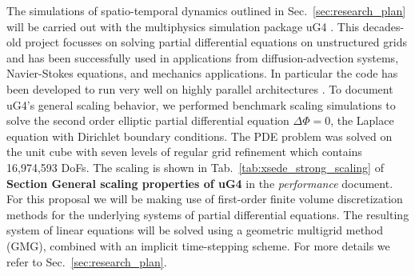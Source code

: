 \label{sec:Project-Details}
The simulations of spatio-temporal dynamics outlined in Sec.~\ref{sec:research_plan} will be carried out with the multiphysics simulation package uG4 \citep{Vogel2013, Heppner13}. This decades-old project focusses on solving partial differential equations on unstructured grids and has been successfully used in applications from diffusion-advection systems, Navier-Stokes equations, and mechanics applications. In particular the code has been developed to run very well on highly parallel architectures \citep{Vogel2013, Heppner13}. To document uG4's general scaling behavior, we performed benchmark scaling simulations to solve the second order elliptic partial differential equation $\Delta \Phi = 0$, the Laplace equation with Dirichlet boundary conditions. The PDE problem was solved on the unit cube with seven levels of regular grid refinement which contains 16,974,593 DoFs. The scaling is shown in Tab.~\ref{tab:xsede_strong_scaling} of \textbf{Section General scaling properties of uG4} in the \textit{performance} document. For this proposal we will be making use of first-order finite volume discretization methods for the underlying systems of partial differential equations. The resulting system of linear equations will be solved using a geometric multigrid method (GMG), combined with an implicit time-stepping scheme. For more details we refer to Sec.~\ref{sec:research_plan}. \\
